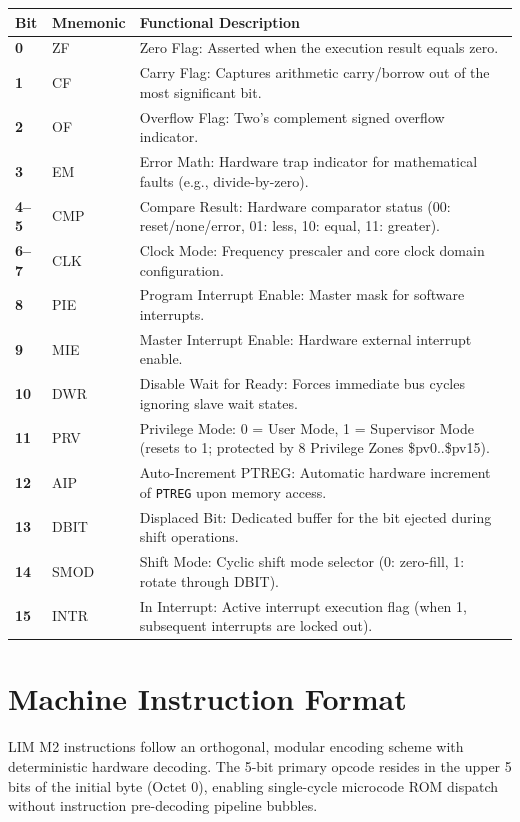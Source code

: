 \documentclass[11pt,a4paper]{article}
\newcommand{\reg}[1]{\texttt{#1}}
\begin{document}
\begin{tabularx}{\textwidth}{>{\bfseries}p{14mm}>{\ttfamily}p{23mm}X}
\toprule
Bit & Mnemonic & Functional Description \\
\midrule
0    & ZF   & Zero Flag: Asserted when the execution result equals zero. \\
1    & CF   & Carry Flag: Captures arithmetic carry/borrow out of the most significant bit. \\
2    & OF   & Overflow Flag: Two's complement signed overflow indicator. \\
3    & EM   & Error Math: Hardware trap indicator for mathematical faults (e.g., divide-by-zero). \\
4--5 & CMP  & Compare Result: Hardware comparator status (00: reset/none/error, 01: less, 10: equal, 11: greater). \\
6--7 & CLK  & Clock Mode: Frequency prescaler and core clock domain configuration. \\
8    & PIE  & Program Interrupt Enable: Master mask for software interrupts. \\
9    & MIE  & Master Interrupt Enable: Hardware external interrupt enable. \\
10   & DWR  & Disable Wait for Ready: Forces immediate bus cycles ignoring slave wait states. \\
11   & PRV  & Privilege Mode: 0 = User Mode, 1 = Supervisor Mode (resets to 1; protected by 8 Privilege Zones \$pv0..\$pv15). \\
12   & AIP  & Auto-Increment PTREG: Automatic hardware increment of \reg{PTREG} upon memory access. \\
13   & DBIT & Displaced Bit: Dedicated buffer for the bit ejected during shift operations. \\
14   & SMOD & Shift Mode: Cyclic shift mode selector (0: zero-fill, 1: rotate through DBIT). \\
15   & INTR & In Interrupt: Active interrupt execution flag (when 1, subsequent interrupts are locked out). \\
\bottomrule
\end{tabularx}

\section{Machine Instruction Format}
LIM M2 instructions follow an orthogonal, modular encoding scheme with deterministic hardware decoding. 
The 5-bit primary opcode resides in the upper 5 bits of the initial byte (Octet 0), enabling single-cycle microcode ROM dispatch without instruction pre-decoding pipeline bubbles.
\end{document}
